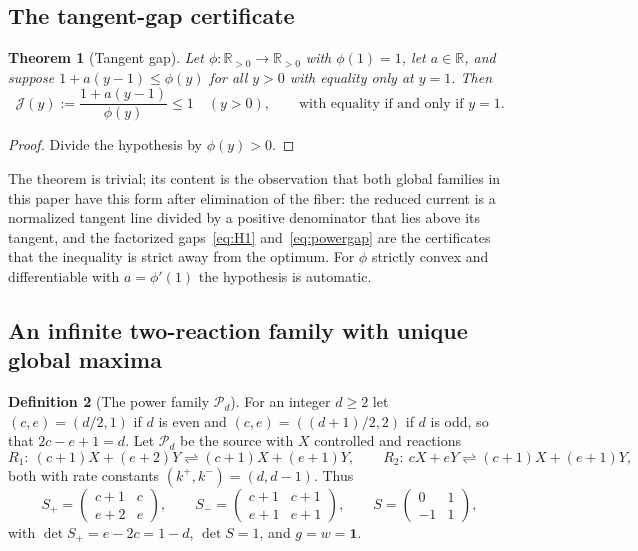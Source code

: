 \documentclass[11pt,reqno]{amsart}
\theoremstyle{plain}
\newtheorem{theorem}{Theorem}[section]
\theoremstyle{definition}
\newtheorem{definition}[theorem]{Definition}
\theoremstyle{remark}
\numberwithin{equation}{section}
\newcommand{\R}{\mathbb{R}}
\newcommand{\one}{\mathbf{1}}
\newcommand{\Sp}{S_{+}}
\newcommand{\Sm}{S_{-}}
\begin{document}
\subsection{The tangent-gap certificate}
\begin{theorem}[Tangent gap]\label{thm:tangentgap}
Let $\phi\colon\R_{>0}\to\R_{>0}$ with $\phi(1)=1$, let $a\in\R$, and suppose $1+a(y-1)\le\phi(y)$ for all $y>0$ with equality only at $y=1$.  Then
\[
\mathcal J(y):=\frac{1+a(y-1)}{\phi(y)}\le1\quad(y>0),\qquad\text{with equality if and only if }y=1 .
\]
\end{theorem}

\begin{proof}
Divide the hypothesis by $\phi(y)>0$.
\end{proof}

The theorem is trivial; its content is the observation that both global families in this paper have this form after elimination of the fiber: the reduced current is a normalized tangent line divided by a positive denominator that lies above its tangent, and the factorized gaps~\eqref{eq:H1} and~\eqref{eq:powergap} are the certificates that the inequality is strict away from the optimum.  For $\phi$ strictly convex and differentiable with $a=\phi'(1)$ the hypothesis is automatic.

\subsection{An infinite two-reaction family with unique global maxima}
\begin{definition}[The power family $\mathcal P_d$]\label{def:power}
For an integer $d\ge2$ let $(c,e)=(d/2,1)$ if $d$ is even and $(c,e)=((d+1)/2,2)$ if $d$ is odd, so that $2c-e+1=d$.  Let $\mathcal P_d$ be the source with $X$ controlled and reactions
\[
R_1:\ (c+1)X+(e+2)Y\rightleftharpoons(c+1)X+(e+1)Y,\qquad R_2:\ cX+eY\rightleftharpoons(c+1)X+(e+1)Y,
\]
both with rate constants $(k^+,k^-)=(d,d-1)$.  Thus
\[
\Sp=\begin{pmatrix}c+1&c\\e+2&e\end{pmatrix},\qquad\Sm=\begin{pmatrix}c+1&c+1\\e+1&e+1\end{pmatrix},\qquad S=\begin{pmatrix}0&1\\-1&1\end{pmatrix},
\]
with $\det\Sp=e-2c=1-d$, $\det S=1$, and $g=w=\one$.
\end{definition}
\end{document}
